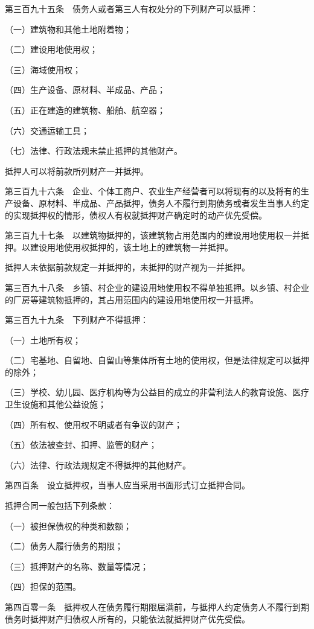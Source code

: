 \documentclass[UTF8,12pt,a4paper]{ctexbook}
\begin{document}
第三百九十五条　债务人或者第三人有权处分的下列财产可以抵押：

（一）建筑物和其他土地附着物；

（二）建设用地使用权；

（三）海域使用权；

（四）生产设备、原材料、半成品、产品；

（五）正在建造的建筑物、船舶、航空器；

（六）交通运输工具；

（七）法律、行政法规未禁止抵押的其他财产。

抵押人可以将前款所列财产一并抵押。

第三百九十六条　企业、个体工商户、农业生产经营者可以将现有的以及将有的生产设备、原材料、半成品、产品抵押，债务人不履行到期债务或者发生当事人约定的实现抵押权的情形，债权人有权就抵押财产确定时的动产优先受偿。

第三百九十七条　以建筑物抵押的，该建筑物占用范围内的建设用地使用权一并抵押。以建设用地使用权抵押的，该土地上的建筑物一并抵押。

抵押人未依据前款规定一并抵押的，未抵押的财产视为一并抵押。

第三百九十八条　乡镇、村企业的建设用地使用权不得单独抵押。以乡镇、村企业的厂房等建筑物抵押的，其占用范围内的建设用地使用权一并抵押。

第三百九十九条　下列财产不得抵押：

（一）土地所有权；

（二）宅基地、自留地、自留山等集体所有土地的使用权，但是法律规定可以抵押的除外；

（三）学校、幼儿园、医疗机构等为公益目的成立的非营利法人的教育设施、医疗卫生设施和其他公益设施；

（四）所有权、使用权不明或者有争议的财产；

（五）依法被查封、扣押、监管的财产；

（六）法律、行政法规规定不得抵押的其他财产。

第四百条　设立抵押权，当事人应当采用书面形式订立抵押合同。

抵押合同一般包括下列条款：

（一）被担保债权的种类和数额；

（二）债务人履行债务的期限；

（三）抵押财产的名称、数量等情况；

（四）担保的范围。

第四百零一条　抵押权人在债务履行期限届满前，与抵押人约定债务人不履行到期债务时抵押财产归债权人所有的，只能依法就抵押财产优先受偿。
\end{document}
